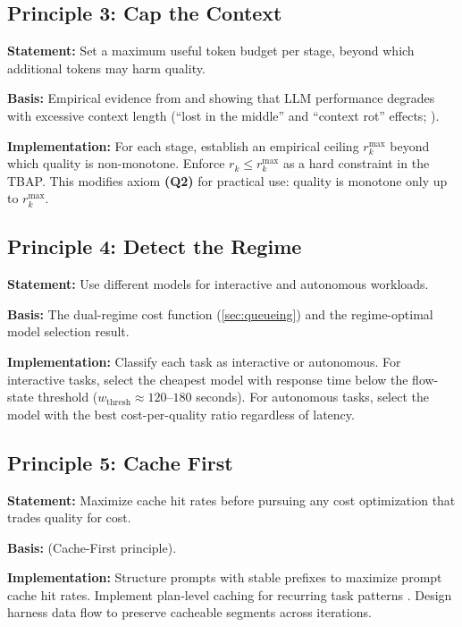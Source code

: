 \documentclass[11pt, a4paper, logo, copyright]{googledeepmind}
\begin{document}
\subsection{Principle 3: Cap the Context}

\textbf{Statement:} Set a maximum useful token budget per stage, beyond which additional tokens may harm quality.

\textbf{Basis:} Empirical evidence from \citet{gao2025context} and \citet{liu2024lost} showing that LLM performance degrades with excessive context length (``lost in the middle'' and ``context rot'' effects; \citealp{chroma2025rot}).

\textbf{Implementation:} For each stage, establish an empirical ceiling $r_k^{\max}$ beyond which quality is non-monotone. Enforce $r_k \leq r_k^{\max}$ as a hard constraint in the TBAP. This modifies axiom \textbf{(Q2)} for practical use: quality is monotone only up to $r_k^{\max}$.

\subsection{Principle 4: Detect the Regime}

\textbf{Statement:} Use different models for interactive and autonomous workloads.

\textbf{Basis:} The dual-regime cost function (\cref{sec:queueing}) and the regime-optimal model selection result.

\textbf{Implementation:} Classify each task as interactive or autonomous. For interactive tasks, select the cheapest model with response time below the flow-state threshold ($w_{\text{thresh}} \approx 120$--$180$ seconds). For autonomous tasks, select the model with the best cost-per-quality ratio regardless of latency.

\subsection{Principle 5: Cache First}

\textbf{Statement:} Maximize cache hit rates before pursuing any cost optimization that trades quality for cost.

\textbf{Basis:}  (Cache-First principle).

\textbf{Implementation:} Structure prompts with stable prefixes to maximize prompt cache hit rates. Implement plan-level caching for recurring task patterns \citep{zhang2025plancache}. Design harness data flow to preserve cacheable segments across iterations.
\end{document}

